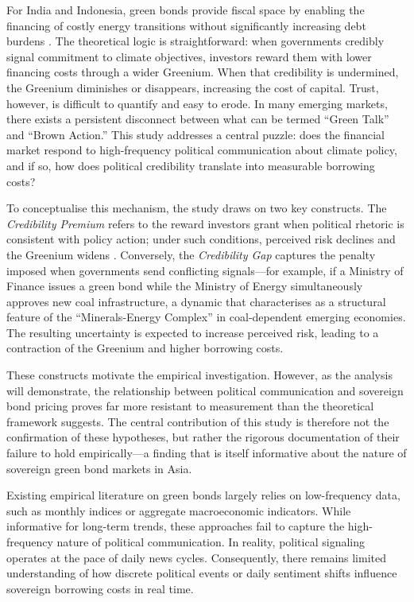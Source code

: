 \documentclass[12pt,a4paper]{article}
\begin{document}
For India and Indonesia, green bonds provide fiscal space by enabling the financing of costly energy transitions without significantly increasing debt burdens \citep{Kling2021}. The theoretical logic is straightforward: when governments credibly signal commitment to climate objectives, investors reward them with lower financing costs through a wider Greenium. When that credibility is undermined, the Greenium diminishes or disappears, increasing the cost of capital. Trust, however, is difficult to quantify and easy to erode. In many emerging markets, there exists a persistent disconnect between what can be termed ``Green Talk'' and ``Brown Action.'' This study addresses a central puzzle: does the financial market respond to high-frequency political communication about climate policy, and if so, how does political credibility translate into measurable borrowing costs?

To conceptualise this mechanism, the study draws on two key constructs. The \textit{Credibility Premium} refers to the reward investors grant when political rhetoric is consistent with policy action; under such conditions, perceived risk declines and the Greenium widens \citep{Lau2024}. Conversely, the \textit{Credibility Gap} captures the penalty imposed when governments send conflicting signals---for example, if a Ministry of Finance issues a green bond while the Ministry of Energy simultaneously approves new coal infrastructure, a dynamic that \citet{Neumann2025} characterises as a structural feature of the ``Minerals-Energy Complex'' in coal-dependent emerging economies. The resulting uncertainty is expected to increase perceived risk, leading to a contraction of the Greenium and higher borrowing costs.

These constructs motivate the empirical investigation. However, as the analysis will demonstrate, the relationship between political communication and sovereign bond pricing proves far more resistant to measurement than the theoretical framework suggests. The central contribution of this study is therefore not the confirmation of these hypotheses, but rather the rigorous documentation of their failure to hold empirically---a finding that is itself informative about the nature of sovereign green bond markets in Asia.



Existing empirical literature on green bonds largely relies on low-frequency data, such as monthly indices or aggregate macroeconomic indicators. While informative for long-term trends, these approaches fail to capture the high-frequency nature of political communication. In reality, political signaling operates at the pace of daily news cycles. Consequently, there remains limited understanding of how discrete political events or daily sentiment shifts influence sovereign borrowing costs in real time.
\end{document}
